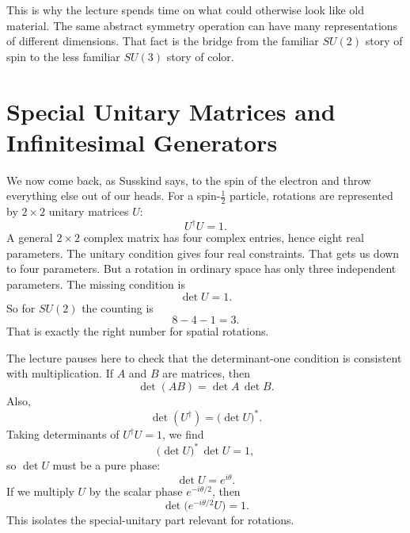 This is why the lecture spends time on what could otherwise look like old material. The same abstract symmetry operation can have many representations of different dimensions. That fact is the bridge from the familiar \(SU(2)\) story of spin to the less familiar \(SU(3)\) story of color.

\section{Special Unitary Matrices and Infinitesimal Generators}

We now come back, as Susskind says, to the spin of the electron and throw everything else out of our heads. For a spin-\(\frac12\) particle, rotations are represented by \(2\times2\) unitary matrices \(U\):
\begin{equation}
U^\dagger U = 1.
\end{equation}
A general \(2\times2\) complex matrix has four complex entries, hence eight real parameters. The unitary condition gives four real constraints. That gets us down to four parameters. But a rotation in ordinary space has only three independent parameters. The missing condition is
\begin{equation}
\det U = 1.
\end{equation}
So for \(SU(2)\) the counting is
\begin{equation}
8-4-1=3.
\end{equation}
That is exactly the right number for spatial rotations.

The lecture pauses here to check that the determinant-one condition is consistent with multiplication. If \(A\) and \(B\) are matrices, then
\begin{equation}
\det(AB)=\det A\,\det B.
\end{equation}
Also,
\begin{equation}
\det(U^\dagger)=\bigl(\det U\bigr)^*.
\end{equation}
Taking determinants of \(U^\dagger U=1\), we find
\begin{equation}
\bigl(\det U\bigr)^*\,\det U = 1,
\end{equation}
so \(\det U\) must be a pure phase:
\begin{equation}
\det U=e^{i\theta}.
\end{equation}
If we multiply \(U\) by the scalar phase \(e^{-i\theta/2}\), then
\begin{equation}
\det\!\bigl(e^{-i\theta/2}U\bigr)=1.
\end{equation}
This isolates the special-unitary part relevant for rotations.

